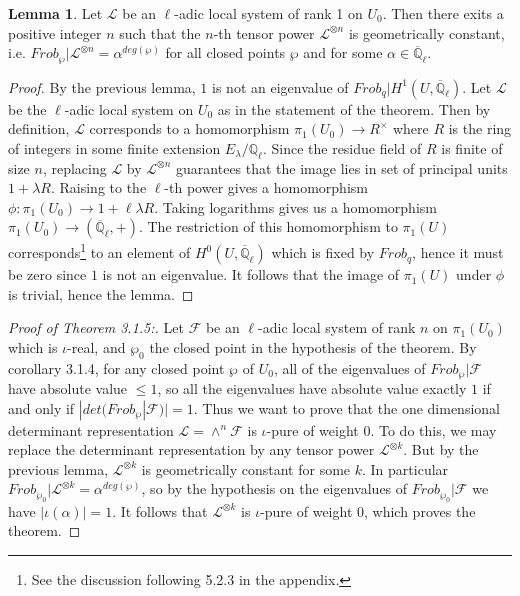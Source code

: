 \documentclass{ucbthesis}
\theoremstyle{definition}
\theoremstyle{theorem}
\newtheorem{lem}[thm]{Lemma}
\begin{document}
\begin{lem}
Let $\mathcal{L}$ be an $\ell$-adic local system of rank 1 on $U_{0}$. Then there exits a positive integer $n
$ such that the $n$-th tensor power $\mathcal{L}^{\otimes n}$ is geometrically constant, i.e. $Frob_{\wp}|\mathcal{L}^{\otimes n} = \alpha^{deg(\wp)}$ for all closed points $\wp$ and for some $\alpha \in \overline{\mathbb{Q}}_{\ell}$. 
\end{lem}

\begin{proof}
By the previous lemma, $1$ is not an eigenvalue of $Frob_{q}|H^{1}(U,\overline{\mathbb{Q}}_{\ell})$. Let $\mathcal{L}$ be the $\ell$-adic local system on $U_{0}$ as in the statement of the theorem. Then by definition, $\mathcal{L}$ corresponds to a homomorphism $\pi_{1}(U_{0}) \rightarrow R^{\times}$ where $R$ is the ring of integers in some finite extension $E_{\lambda}/\mathbb{Q}_{\ell}$. Since the residue field of $R$ is finite of size $n$, replacing $\mathcal{L}$ by $\mathcal{L}^{\otimes n}$ guarantees that the image lies in set of principal units $1 + \lambda R$. Raising to the $\ell$-th power gives a homomorphism $\phi: \pi_{1}(U_{0}) \rightarrow  1 + \ell\lambda R$. Taking logarithms gives us a homomorphism $\pi_{1}(U_{0}) \rightarrow (\overline{\mathbb{Q}}_{\ell},+)$. The restriction of this homomorphism to $\pi_{1}(U)$ corresponds\footnote{See the discussion following 5.2.3 in the appendix.} to an element of $H^{0}(U,\overline{\mathbb{Q}}_{\ell})$ which is fixed by $Frob_{q}$, hence it must be zero since $1$ is not an eigenvalue. It follows that the image of $\pi_{1}(U)$ under $\phi$ is trivial, hence the lemma. 
\end{proof}

\begin{proof}[Proof of Theorem 3.1.5:]
Let $\mathcal{F}$ be an $\ell$-adic local system of rank $n$ on $\pi_{1}(U_{0})$ which is $\iota$-real, and $\wp_{0}$  the closed point in the hypothesis of the theorem. By corollary 3.1.4, for any closed point $\wp$ of $U_{0}$, all of the eigenvalues of $Frob_{\wp}|\mathcal{F}$ have absolute value $\leq 1$, so all the eigenvalues have absolute value exactly $1$ if and only if $|det(Frob_{\wp}|\mathcal{F})|=1$. Thus we want to prove that the one dimensional determinant representation $\mathcal{L} = \wedge^{n}\mathcal{F}$ is $\iota$-pure of weight $0$. To do this, we may replace the determinant representation by any tensor power $\mathcal{L}^{\otimes k}$. But by the previous lemma, $\mathcal{L}^{\otimes k}$ is geometrically constant for some $k$. In particular $Frob_{\wp_{0}}|\mathcal{L}^{\otimes k} = \alpha^{deg(\wp)}$, so by the hypothesis on the eigenvalues of $Frob_{\wp_0}|\mathcal{F}$ we have $|\iota({\alpha})| = 1$. It follows that $\mathcal{L}^{\otimes k}$ is $\iota$-pure of weight $0$, which proves the theorem. 
\end{proof}
\end{document}

